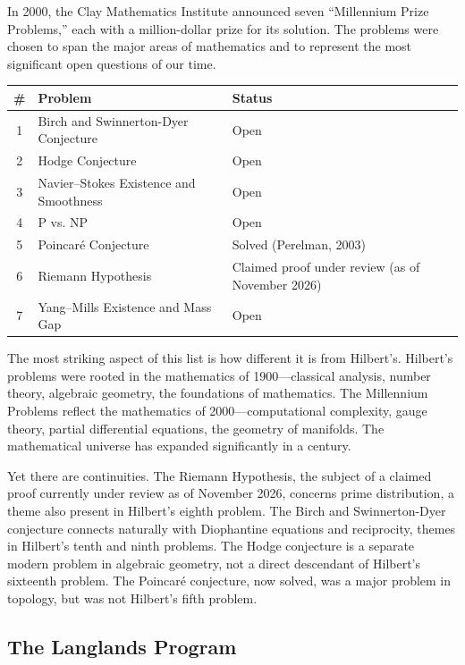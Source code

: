 In 2000, the Clay Mathematics Institute announced seven ``Millennium Prize Problems,'' each with a million-dollar prize for its solution. The problems were chosen to span the major areas of mathematics and to represent the most significant open questions of our time.

\begin{center}
\small
\renewcommand{\arraystretch}{1.2}
\begin{tabularx}{\textwidth}{c X p{5.5cm}}
\toprule
\textbf{\#} & \textbf{Problem} & \textbf{Status} \\
\midrule
1 & Birch and Swinnerton-Dyer Conjecture & Open \\
2 & Hodge Conjecture & Open \\
3 & Navier--Stokes Existence and Smoothness & Open \\
4 & P vs. NP & Open \\
5 & Poincar\'e Conjecture & Solved (Perelman, 2003) \\
6 & Riemann Hypothesis & Claimed proof under review (as of November 2026) \\
7 & Yang--Mills Existence and Mass Gap & Open \\
\bottomrule
\end{tabularx}
\end{center}

The most striking aspect of this list is how different it is from Hilbert's. Hilbert's problems were rooted in the mathematics of 1900---classical analysis, number theory, algebraic geometry, the foundations of mathematics. The Millennium Problems reflect the mathematics of 2000---computational complexity, gauge theory, partial differential equations, the geometry of manifolds. The mathematical universe has expanded significantly in a century.

Yet there are continuities. The Riemann Hypothesis, the subject of a claimed proof currently under review as of November 2026, concerns prime distribution, a theme also present in Hilbert's eighth problem. The Birch and Swinnerton-Dyer conjecture connects naturally with Diophantine equations and reciprocity, themes in Hilbert's tenth and ninth problems. The Hodge conjecture is a separate modern problem in algebraic geometry, not a direct descendant of Hilbert's sixteenth problem. The Poincar\'e conjecture, now solved, was a major problem in topology, but was not Hilbert's fifth problem.

\subsection{The Langlands Program}

